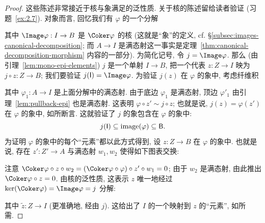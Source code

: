 \begin{proof}
这些陈述非常接近于核与象满足的泛性质.
关于核的陈述留给读者验证 (习题~\ref{ex:2.7}). 对象而言, 回忆我们有 $\varphi$ 的一个分解
\begin{center}
\end{center}
其中 $\Image\varphi:I\to B$ 是 $\Coker\varphi$ 的核 (这就是``象''的定义, cf. \S\ref{subsec:images-canonical-decomposition}; 而 $A\to I$ 是满态射这一事实是定理~\ref{thm:canonical-decomposition-morphism} 内容的一部分).
为简化记号, 令 $j=\Image\varphi$. 那么 (由引理~\ref{lem:mono-epi-elements}) $j$ 是一个单射 $I\to B$, 把一个代表 $z:Z\to I$ 映为 $j\circ z:Z\to B$; 我们要验证 $j(\mathsf{I})=\Image\varphi$. 为验证 $j(z)$ 在 $\varphi$ 的象中, 考虑纤维积
\begin{center}
\end{center}
其中 $\varphi_1:A\to I$ 是上面分解中的满态射. 由于底边 $\varphi_1$ 是满态射, 顶边 $\varphi'_1$ 由引理~\ref{lem:pullback-epi} 也是满态射. 这表明 $\varphi\circ z'\sim j\circ z$; 也就是说, $j(z)=\varphi(z')$ 在 $\varphi$ 的象中, 如所断言. 这就验证了 $j$ 的象包含在 $\varphi$ 的象中:
\[
j(\mathsf{I})\subseteq \operatorname{image}(\varphi)\subseteq \mathsf{B}.
\]
\indent 为证明 $\varphi$ 的象中的每个``元素''都以此方式得到, 设 $z:Z\to B$ 在 $\varphi$ 的象中. 也就是说, 存在 $z':Z'\to A$ 与满态射 $w_1,w_2$ 使得如下图表交换:
\begin{center}
\end{center}
注意 $\Coker\varphi\circ z\circ w_2=(\Coker\varphi\circ\varphi)\circ z'\circ w_1=0$; 由于 $w_2$ 是满态射, 由此推出 $\Coker\varphi\circ z=0$. 由核的泛性质, 这表示 $z$ 唯一地经过 $\ker(\Coker\varphi)=\Image\varphi=j$ 分解:
\begin{center}
\end{center}
其中 $\tilde z:Z\to I$ (更准确地, 经由 $j$). 这给出了 $I$ 的一个映射到 $z$ 的``元素'', 如所需.
\end{proof}

